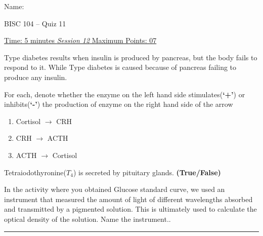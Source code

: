 \documentclass[11pt,paper=a4,answers]{exam}
\begin{document}

\noindent
\begin{minipage}[l]{.5\textwidth}%
\noindent
Name: \underline{\hspace{7cm}}
\end{minipage}
\hfill
\begin{minipage}[r]{0.22\textwidth}%
\begin{center}
{%
\large BISC 104 -- Quiz 11\\[2pt]} %
\end{center}
\end{minipage}
\par
\noindent
\uline{Time: 5 minutes   \hfill \normalsize\emph{\underline{Session 12}} \hfill        Maximum Points: 07}
\begin{questions}

\pointsinrightmargin
\pointsdroppedatright
\marksnotpoints
\pointformat{\boldmath\themarginpoints}
\bracketedpoints
\question[02]
Type \underline{\hspace*{1cm}} diabetes results when insulin is produced by pancreas, but the body fails to respond to it. While Type \underline{\hspace*{1cm}} diabetes
is caused because of pancreas failing to produce any insulin.
\droppoints

\question[03]
For each, denote whether the enzyme on the left hand side stimulates(\textbf{`+'}) or inhibits(\textbf{`-'}) the production of enzyme on the right hand side of the arrow
\droppoints
\begin{enumerate}[label=\alph*]
\item Cortisol $\longrightarrow$ CRH
\item CRH $\longrightarrow$ ACTH
\item ACTH $\longrightarrow$ Cortisol
\end{enumerate}

\question[01]
Tetraiodothyronine($T_4$) is secreted by pituitary glands. \textbf{(True/False)}
\droppoints

\question[01]
In the activity where you obtained Glucose standard curve, we used an instrument that measured the amount of light of different wavelengths absorbed and transmitted by a pigmented solution. This is ultimately used to calculate the optical density of the solution. Name the instrument..
\droppoints


\end{questions}
\begin{center}
\rule{\textwidth}{1pt}
\end{center}
\end{document}
